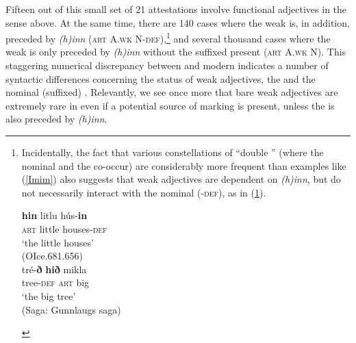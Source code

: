 \documentclass[output=paper,colorlinks,citecolor=brown]{langscibook}
\begin{document}
Fifteen out of this small set of 21 attestations involve functional adjectives in the sense above. At the same time, there are 140 cases where the weak  is, in addition, preceded by \textit{(h)inn}  (\textsc{art A.wk N-def}),\footnote{\label{DD}Incidentally, the fact that various constellations of ``double '' (where the nominal and the  co-occur) are considerably more frequent than examples like (\ref{Imim}) also suggests that weak adjectives are dependent on \textit{(h)inn}, but do not necessarily interact with the nominal  (\textsc{-def}), as in (\ref{BaIsPo}). 
\begin{multicols}{2}
\begin{exe}
 \ex  \label{BaIsPo}
  \begin{xlist}
      \ex\gll  \textbf{hin} litlu hús-\textbf{in}    \\ 
      \textsc{art} little houses-\textsc{def}  \\ 
      \glt `the little houses' \\(OIce.681.656) \\ 

      \ex\gll  tré-\textbf{ð} \textbf{hið} mikla   \\ 
       tree-\textsc{def} \textsc{art} big \\ 
       \glt  `the big tree' \\ (Saga: Gunnlaugs saga)

  \end{xlist}
\end{exe}
\end{multicols}  }  
and several thousand cases where the weak  is only preceded by \textit{(h)inn}   without the suffixed  present  (\textsc{art A.wk N}). 
This staggering numerical discrepancy between  and modern  indicates a number of syntactic differences concerning the status of weak adjectives, the  and the nominal (suffixed) . Relevantly, we see once more that bare weak adjectives are extremely rare in  even if a potential source of  marking is present, unless the  is also preceded by \textit{(h)inn}.  
\end{document}
